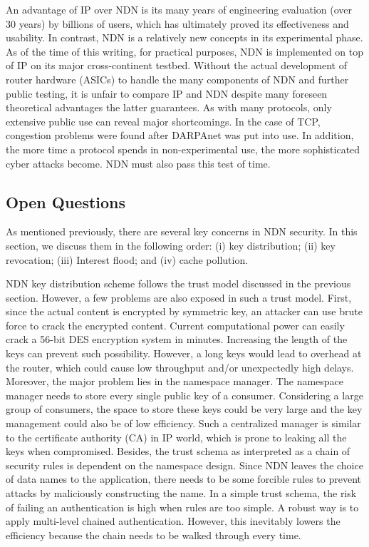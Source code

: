 \documentclass[conference,compsoc]{IEEEtran}
\begin{document}
An advantage of IP over NDN is its many years of engineering evaluation (over 30 years) by billions of users, which has ultimately proved its effectiveness and usability. In contrast, NDN is a relatively new concepts in its experimental phase. As of the time of this writing, for practical purposes, NDN is implemented on top of IP on its major cross-continent testbed. Without the actual development of router hardware (ASICs) to handle the many components of NDN and further public testing, it is unfair to compare IP and NDN despite many foreseen theoretical advantages the latter guarantees.  As with many protocols, only extensive public use can reveal major shortcomings. In the case of TCP, congestion problems were found after DARPAnet was put into use. In addition, the more time a protocol spends in non-experimental use, the more sophisticated cyber attacks become. NDN must also pass this test of time.

\subsection{Open Questions}
As mentioned previously, there are several key concerns in NDN security. In this section, we discuss them in the following order: (i) key distribution; (ii) key revocation; (iii) Interest flood; and (iv) cache pollution.

NDN key distribution scheme follows the trust model discussed in the previous section. However, a few problems are also exposed in such a trust model. First, since the actual content is encrypted by symmetric key, an attacker can use brute force to crack the encrypted content. Current computational power can easily crack a 56-bit DES encryption system in minutes.  Increasing the length of the keys can prevent such possibility. However, a long keys  would lead to overhead at the router, which could cause low throughput and/or unexpectedly high delays. Moreover, the major problem lies in the namespace manager. 
The namespace manager needs to store every single public key of a consumer. Considering a large group of consumers, the space to store these keys could be very large and the key management could also be of low efficiency. Such a centralized manager is similar to the certificate authority (CA) in IP world, which is prone to leaking all the keys when compromised. Besides, the trust schema as interpreted as a chain of security rules is dependent on the namespace design. Since NDN leaves the choice of data names to the application, there needs to be some forcible rules to prevent attacks by maliciously constructing the name. In a simple trust schema, the risk of failing an authentication is high when rules are too simple. A robust way is to apply multi-level chained authentication. However, this inevitably lowers the efficiency because the chain needs to be walked through every time.
\end{document}
